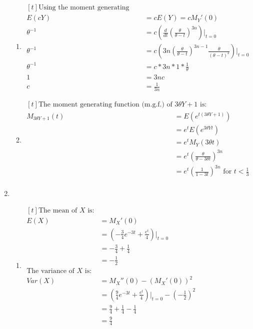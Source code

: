 \documentclass{article}
\begin{document}
\begin{enumerate}
\begin{enumerate}[label=(\roman*)]
    \item $\begin{aligned}[t]
    \text{Using the moment generating function, } \\
    E(cY) &= cE(Y) = cM_Y'(0) \\
    \theta^{-1} &= c(\frac{d}{dt}(\frac{\theta}{\theta-t})^{3n})|_{t=0} \\
    \theta^{-1} &= c(3n(\frac{\theta}{\theta-t})^{3n-1}\frac{\theta}{(\theta-t)^2})|_{t=0} \\
    \theta^{-1} &= c*3n*1*\frac{1}{\theta} \\
    1 &= 3nc \\
    c &= \frac{1}{3n}
    \end{aligned}$

    \item $\begin{aligned}[t]
    \text{The moment generating function (m.g.f.) of } 3\theta Y+1 \text{ is:} \\
    M_{3\theta Y+1}(t) &= E(e^{t(3\theta Y+1)}) \\
    &= e^t E(e^{3\theta Yt}) \\
    &= e^t M_{Y}(3\theta t) \\
    &= e^t (\frac{\theta}{\theta-3\theta t})^{3n} \\
    &= e^t (\frac{1}{1-3t})^{3n} \text{ for } t < \frac{1}{3} \\
    \end{aligned}$
    \end{enumerate}

\item
    \begin{enumerate}[label=(\roman*)]
    \item $\begin{aligned}[t]
    \text{The mean of } X \text{ is:} \\
    E(X) &= M_X'(0) \\
    &= (-\frac{3}{4}e^{-3t}+\frac{e^t}{4})|_{t=0} \\
    &= -\frac{3}{4} + \frac{1}{4} \\
    &= -\frac{1}{2} \\
    \text{The variance of } X \text{ is:} \\
    Var(X) &= M_X''(0) - (M_X'(0))^2 \\
    &= (\frac{9}{4}e^{-3t}+\frac{e^t}{4})|_{t=0} - (-\frac{1}{2})^2 \\
    &= \frac{9}{4} + \frac{1}{4} - \frac{1}{4} \\
    &= \frac{9}{4}
    \end{aligned}$


\end{enumerate}
\end{enumerate}
\end{document}
